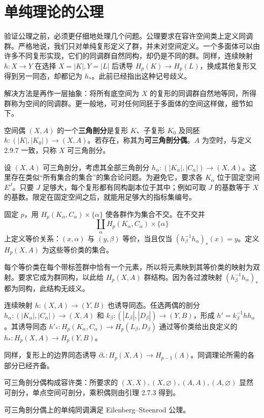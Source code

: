 \section{单纯理论的公理}
验证公理之前，必须更仔细地处理几个问题。公理要求在容许空间类上定义同调群。严格地说，我们只对单纯复形定义了群，并未对空间定义。一个多面体可以由许多不同复形实现，它们的同调群自然同构，却仍是不同的群。同样，连续映射 $h:X\to Y$ 在选择 $X=|K|,Y=|L|$ 后诱导 $H_p(K)\to H_p(L)$，换成其他复形又得到另一同态，却都记为 $h_*$。此前已经指出这种记号歧义。

解决方法是再作一层抽象：将所有底空间为 $X$ 的复形的同调群自然地等同，所得群称为空间的同调群。更一般地，可对任何同胚于多面体的空间这样做，细节如下。

空间偶 $(X,A)$ 的一个\textbf{三角剖分}是复形 $K$、子复形 $K_0$ 及同胚 $h:(|K|,|K_0|)\to(X,A)$。若存在，称其为\textbf{可三角剖分偶}。$A$ 为空时，与定义 2.9.7 一致，只称 $X$ 可三角剖分。

设 $(X,A)$ 可三角剖分，考虑其全部三角剖分 $h_\alpha:(|K_\alpha|,|C_\alpha|)\to(X,A)$。这里存在类似“所有集合的集合”的集合论问题。为避免它，要求各 $K_\alpha$ 位于固定空间 $E^J$。只要 $J$ 足够大，每个复形都有同构副本位于其中；例如可取 $J$ 的基数等于 $X$ 的基数。限定在固定空间之后，就能用足够大的指标集编号。

固定 $p$，用 $H_p(K_\alpha,C_\alpha)\times\{\alpha\}$ 使各群作为集合不交。在不交并
\[
\coprod_\alpha H_p(K_\alpha,C_\alpha)\times\{\alpha\}\tag{$*$}
\]
上定义等价关系：$(x,\alpha)$ 与 $(y,\beta)$ 等价，当且仅当 $(h_\beta^{-1}h_\alpha)_*(x)=y$。定义 $H_p(X,A)$ 为这些等价类的集合。

每个等价类在每个带标签群中恰有一个元素，所以将元素映到其等价类的映射为双射。要求它成为群同构，以此给 $H_p(X,A)$ 群结构。因为各过渡映射 $(h_\beta^{-1}h_\alpha)_*$ 都为同构，此结构无歧义。

连续映射 $h:(X,A)\to(Y,B)$ 也诱导同态。任选两偶的剖分 $h_\alpha:(|K_\alpha|,|C_\alpha|)\to(X,A)$ 和 $k_\beta:(|L_\beta|,|D_\beta|)\to(Y,B)$，形成 $h'=k_\beta^{-1}hh_\alpha$。其诱导同态 $h'_*:H_p(K_\alpha,C_\alpha)\to H_p(L_\beta,D_\beta)$ 通过等价类给出良定义的 $h_*:H_p(X,A)\to H_p(Y,B)$。

同样，复形上的边界同态诱导 $\partial_*:H_p(X,A)\to H_{p-1}(A)$。同调理论所需的各部分已经齐备。

可三角剖分偶构成容许类：所要求的 $(X,X),(X,\varnothing),(A,A),(A,\varnothing)$ 显然可剖分，单点空间可剖分，乘积偶则由引理 2.7.3 得到。

可三角剖分偶上的单纯同调满足 Eilenberg--Steenrod 公理。

